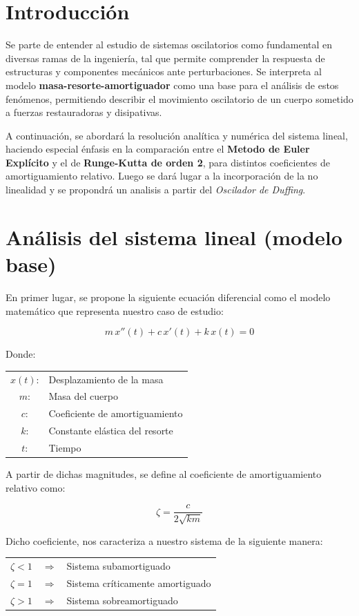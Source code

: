 \documentclass[titlepage,a4paper]{article}
\begin{document}
\section{Introducción}

Se parte de entender al estudio de sistemas oscilatorios como fundamental en diversas ramas de la ingeniería, tal que permite comprender la respuesta de estructuras y componentes mecánicos ante perturbaciones. Se interpreta al modelo \textbf{masa-resorte-amortiguador} como una base para el análisis de estos fenómenos, permitiendo describir el movimiento oscilatorio de un cuerpo sometido a fuerzas restauradoras y disipativas. 

A continuación, se abordará la resolución analítica y numérica del sistema lineal, haciendo especial énfasis en la comparación entre el \textbf{Metodo de Euler Explícito} y el de \textbf{Runge-Kutta de orden 2}, para distintos coeficientes de amortiguamiento relativo. Luego se dará lugar a la incorporación de la no linealidad y se propondrá un analisis a partir del \textit{Oscilador de Duffing}.

\section{Análisis del sistema lineal (modelo base)}

En primer lugar, se propone la siguiente ecuación diferencial como el modelo matemático que representa nuestro caso de estudio:

\[
m\,x''(t) + c\,x'(t) + k\,x(t) = 0
\]

Donde:  
\begin{table}[H]
\centering
\begin{tabular}{cl}
$x(t)$: & Desplazamiento de la masa \\
$m$: & Masa del cuerpo \\
$c$: & Coeficiente de amortiguamiento \\
$k$: & Constante elástica del resorte \\
$t$: & Tiempo \\
\end{tabular}
\end{table}

A partir de dichas magnitudes, se define al coeficiente de amortiguamiento relativo como:

\[
\zeta = \frac{c}{2\sqrt{km}}
\]

Dicho coeficiente, nos caracteriza a nuestro sistema de la siguiente manera:
\begin{table}[H]
\centering
\begin{tabular}{c c l}
$\zeta < 1$ & $\Rightarrow$ & Sistema subamortiguado \\
$\zeta = 1$ & $\Rightarrow$ & Sistema críticamente amortiguado \\
$\zeta > 1$ & $\Rightarrow$ & Sistema sobreamortiguado \\
\end{tabular}
\end{table}
\end{document}

